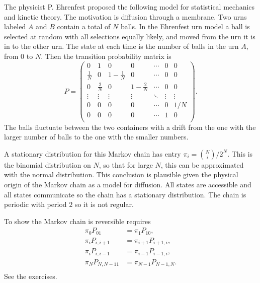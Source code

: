 \documentclass[12pt]{article}
\begin{document}
The physicist P. Ehrenfest proposed the following model for statistical
mechanics and kinetic theory.  The motivation is diffusion through a
membrane.  Two urns labeled \( A \) and \( B \) contain a total of \( N \)
balls.  In the Ehrenfest urn model a%
%
%
ball is selected at random with all selections equally likely, and moved
from the urn it is in to the other urn.  The state at each time is the
number of balls in the urn \( A \), from \( 0 \) to \( N \).  Then the
transition probability matrix is
\[
    P =
    \begin{pmatrix}
        0       & 1     & 0     & 0     & \cdots        & 0     & 0 \\
        \frac{1}{N}     & 0     & 1-\frac{1}{N} & 0     & \cdots
        & 0     & 0 \\
        0       & \frac{2}{N}   & 0     & 1-\frac{2}{N} & \cdots
        & 0     & 0 \\
        \vdots  & \vdots        & \vdots        & \vdots        & \ddots&
        \vdots  & \vdots \\
        0       & 0     & 0     & 0     & \cdots        & 0     & 1/N \\
        0       & 0     & 0     & 0     & \cdots        & 1     & 0 \\
    \end{pmatrix}
    .
\] The balls fluctuate between the two containers with a drift from the
one with the larger number of balls to the one with the smaller numbers.

A stationary distribution for this Markov chain has entry \( \pi_i =
\binom{N}{i}/2^N \).  This is the binomial distribution on \( N \), so
that for large \( N \), this can be approximated with the normal
distribution.  This conclusion is plausible given the physical origin of
the Markov chain as a model for diffusion.  All states are accessible
and all states communicate so the chain has a stationary distribution.
The chain is periodic with period \( 2 \) so it is not regular.

To show the Markov chain is reversible requires
\begin{align*}
    \pi_0 P_{01}        &= \pi_1 P_{10}, \\
    \pi_i P_{i,i+1}     &= \pi_{i+1} P_{i+1,i}, \\
    \pi_i P_{i,i-1}     &= \pi_{i-1} P_{i-1,i}, \\
    \pi_N P_{N,N-11}    &= \pi_{N-1} P_{N-1,N}.  \\
\end{align*}
See the exercises.
\end{document}
